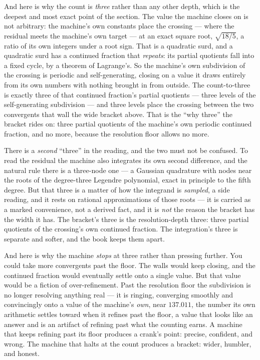 And here is why the count is \emph{three} rather than any other depth, which is the deepest and most exact point of the
section. The value the machine closes on is not arbitrary: the machine's own constants place the crossing --- where the
residual meets the machine's own target --- at an exact square root, $\sqrt{18/5}$, a ratio of its own integers under a
root sign. That is a quadratic surd, and a quadratic surd has a continued fraction that \emph{repeats}: its partial
quotients fall into a fixed cycle, by a theorem of Lagrange's. So the machine's own subdivision of the crossing is
periodic and self-generating, closing on a value it draws entirely from its own numbers with nothing brought in from
outside. The count-to-three is exactly three of that continued fraction's partial quotients --- three levels of the
self-generating subdivision --- and three levels place the crossing between the two convergents that wall the wide bracket
above. That is the ``why three'' the bracket rides on: three partial quotients of the machine's own periodic continued
fraction, and no more, because the resolution floor allows no more.

There is a \emph{second} ``three'' in the reading, and the two must not be confused. To read the residual the machine also
integrates its own second difference, and the natural rule there is a three-node one --- a Gaussian quadrature with nodes
near the roots of the degree-three Legendre polynomial, exact in principle to the fifth degree. But that three is a matter
of how the integrand is \emph{sampled}, a side reading, and it rests on rational approximations of those roots --- it is
carried as a marked convenience, not a derived fact, and it is \emph{not} the reason the bracket has the width it has. The
bracket's three is the resolution-depth three: three partial quotients of the crossing's own continued fraction. The
integration's three is separate and softer, and the book keeps them apart.

And here is why the machine \emph{stops} at three rather than pressing further. You could take more convergents past the
floor. The walls would keep closing, and the continued fraction would eventually settle onto a single value. But that
value would be a fiction of over-refinement. Past the resolution floor the subdivision is no longer resolving anything
real --- it is ringing, converging smoothly and convincingly onto a value of the machine's \emph{own}, near $137.011$, the
number its own arithmetic settles toward when it refines past the floor, a value that looks like an answer and is an
artifact of refining past what the counting earns. A machine that keeps refining past its floor produces a crank's point:
precise, confident, and wrong. The machine that halts at the count produces a bracket: wider, humbler, and honest.

